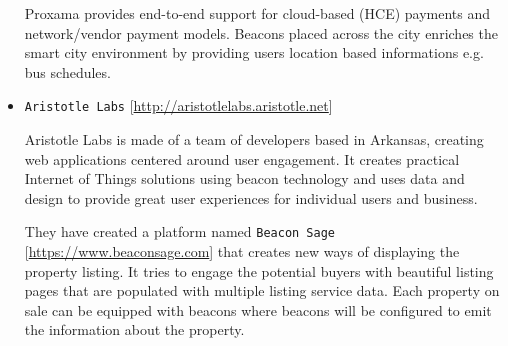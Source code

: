 \begin{itemize}
	
	Proxama provides end-to-end support for cloud-based (HCE) payments and network/vendor payment models. Beacons placed across the city enriches the smart city environment by providing users location based informations e.g. bus schedules.
	
	\item \texttt{Aristotle Labs\cite{AristotleLabs}} [\url{http://aristotlelabs.aristotle.net}]
	
	Aristotle Labs is made of a team of developers based in Arkansas, creating  web applications  centered around user engagement. It creates practical Internet of Things solutions using beacon technology and uses data and design to provide  great user experiences for individual users and business.
	
	They have created a platform named \texttt{Beacon Sage\cite{BeaconSage}} [\url{https://www.beaconsage.com}] that creates new ways of displaying the property listing. It tries to engage the potential buyers with beautiful listing pages that are populated with multiple listing service data. Each property on sale can be equipped with beacons where beacons will be configured to emit the information about the property.
	
\end{itemize}
\pagebreak
